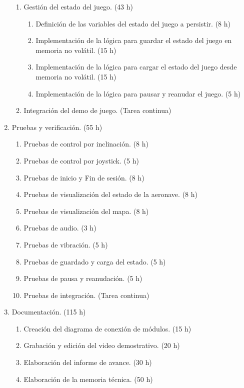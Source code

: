 \documentclass[
11pt, %
]{charter}
\begin{document}
\begin{enumerate}
\begin{enumerate}
	\item	Gestión del estado del juego. (43 h)
	\begin{enumerate}	
	\item	Definición de las variables del estado del juego a persistir. (8 h)
	\item	Implementación de la lógica para guardar el estado del juego en memoria no volátil. (15 h)
	\item	Implementación de la lógica para cargar el estado del juego desde memoria no volátil. (15 h)
	\item	Implementación de la lógica para pausar y reanudar el juego. (5 h)
	\end{enumerate}	
	\item	Integración del demo de juego. (Tarea continua)
	\end{enumerate}	
	\item	Pruebas y verificación. (55 h)
	\begin{enumerate}	
	\item	Pruebas de control por inclinación. (8 h)
	\item	Pruebas de control por joystick. (5 h)
	\item	Pruebas de inicio y Fin de sesión. (8 h)
	\item	Pruebas de visualización del estado de la aeronave. (8 h)
	\item	Pruebas de visualización del mapa. (8 h)
	\item	Pruebas de audio. (3 h)
	\item	Pruebas de vibración. (5 h)
	\item	Pruebas de guardado y carga del estado. (5 h)
	\item	Pruebas de pausa y reanudación. (5 h)
	\item	Pruebas de integración. (Tarea continua)
	\end{enumerate}	
	\item	Documentación. (115 h)
	\begin{enumerate}	
	\item	Creación del diagrama de conexión de módulos. (15 h)
	\item	Grabación y edición del video demostrativo. (20 h)
	\item	Elaboración del informe de avance. (30 h)
	\item	Elaboración de la memoria técnica. (50 h)
	\end{enumerate}	
		

\end{enumerate}
\end{document}
